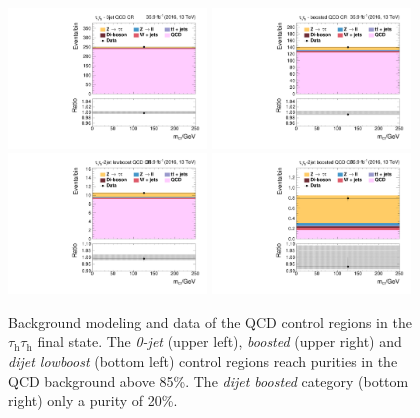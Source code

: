 \begin{figure}[h!]
    \centering
    \includegraphics[width=0.47\textwidth]{Figures/background_estimation/qcd_tt_control-regions/htt_inputtt10__htt_tt_10_13TeV.pdf}
    \includegraphics[width=0.47\textwidth]{Figures/background_estimation/qcd_tt_control-regions/htt_inputtt11__htt_tt_11_13TeV.pdf} \\
    \includegraphics[width=0.47\textwidth]{Figures/background_estimation/qcd_tt_control-regions/htt_inputtt12__htt_tt_12_13TeV.pdf}
    \includegraphics[width=0.47\textwidth]{Figures/background_estimation/qcd_tt_control-regions/htt_inputtt13__htt_tt_13_13TeV.pdf} 
    \caption{Background modeling and data of the QCD control regions in the $\tau_\text{h}\tau_\text{h}$ final state. The \textit{0-jet} (upper left), \textit{boosted} (upper right) and \textit{dijet lowboost} (bottom left) control regions reach purities in the QCD background above 85\%.
    The \textit{dijet boosted} category (bottom right) only a purity of 20\%.}\label{bkg:tt_crs}
\end{figure}

